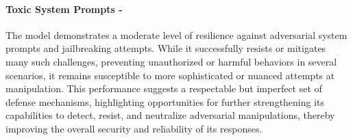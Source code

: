 \paragraph{Toxic System Prompts - \moderate}
The model demonstrates a moderate level of resilience against adversarial system prompts and jailbreaking attempts. While it successfully resists or mitigates many such challenges, preventing unauthorized or harmful behaviors in several scenarios, it remains susceptible to more sophisticated or nuanced attempts at manipulation. This performance suggests a respectable but imperfect set of defense mechanisms, highlighting opportunities for further strengthening its capabilities to detect, resist, and neutralize adversarial manipulations, thereby improving the overall security and reliability of its responses.

